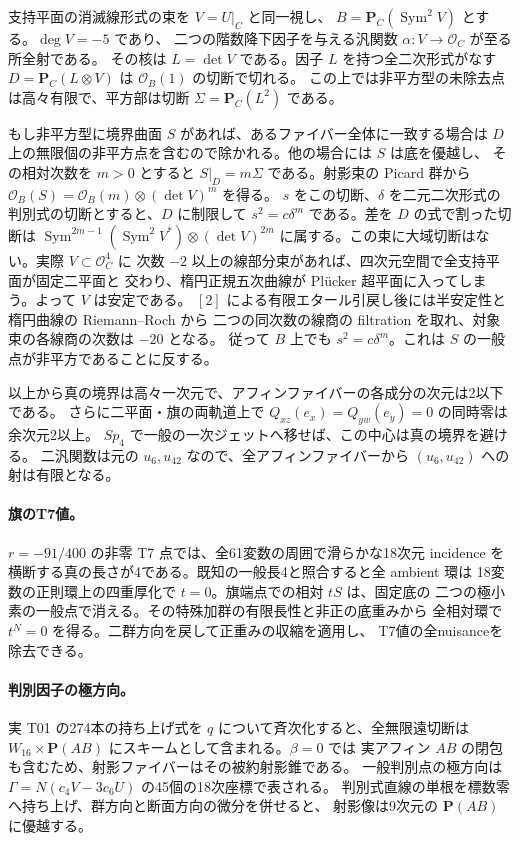 \documentclass[11pt,a4paper]{ltjsarticle}
\theoremstyle{remark}
\begin{document}
支持平面の消滅線形式の束を $V=U|_C$ と同一視し、
$B=\mathbf P_C(\operatorname{Sym}^2V)$ とする。$\deg V=-5$ であり、
二つの階数降下因子を与える汎関数 $\alpha:V\to\mathcal O_C$ が至る所全射である。
その核は $L=\det V$ である。因子 $L$ を持つ全二次形式がなす
$D=\mathbf P_C(L\otimes V)$ は $\mathcal O_B(1)$ の切断で切れる。
この上では非平方型の未除去点は高々有限で、平方部は切断
$\Sigma=\mathbf P_C(L^2)$ である\cite{bound-two-v57,bound-review-v57}。

もし非平方型に境界曲面 $S$ があれば、あるファイバー全体に一致する場合は
$D$ 上の無限個の非平方点を含むので除かれる。他の場合には $S$ は底を優越し、
その相対次数を $m>0$ とすると $S|_D=m\Sigma$ である。射影束の Picard 群から
$\mathcal O_B(S)=\mathcal O_B(m)\otimes(\det V)^m$ を得る。
$s$ をこの切断、$\delta$ を二元二次形式の判別式の切断とすると、$D$ に制限して
$s^2=c\delta^m$ である。差を $D$ の式で割った切断は
$\operatorname{Sym}^{2m-1}(\operatorname{Sym}^2V^*)\otimes(\det V)^{2m}$
に属する。この束に大域切断はない。実際 $V\subset\mathcal O_C^4$ に
次数 $-2$ 以上の線部分束があれば、四次元空間で全支持平面が固定二平面と
交わり、楕円正規五次曲線が Plücker 超平面に入ってしまう。よって $V$ は安定である。
$[2]$ による有限エタール引戻し後には半安定性と楕円曲線の Riemann--Roch から
二つの同次数の線商の filtration を取れ、対象束の各線商の次数は $-20$ となる。
従って $B$ 上でも $s^2=c\delta^m$。これは $S$ の一般点が非平方であることに反する。

以上から真の境界は高々一次元で、アフィンファイバーの各成分の次元は2以下である。
さらに二平面・旗の両軌道上で $Q_{xz}(e_x)=Q_{yw}(e_y)=0$ の同時零は余次元2以上。
$Sp_4$ で一般の一次ジェットへ移せば、この中心は真の境界を避ける。
二汎関数は元の $u_6,u_{42}$ なので、全アフィンファイバーから
$(u_6,u_{42})$ への射は有限となる\cite{two-coord-v57}。

\paragraph{旗のT7値。}
$r=-91/400$ の非零 T7 点では、全61変数の周囲で滑らかな18次元 incidence
を横断する真の長さが4である。既知の一般長4と照合すると全 ambient 環は
18変数の正則環上の四重厚化で $t=0$。旗端点での相対 $tS$ は、固定底の
二つの極小素の一般点で消える。その特殊加群の有限長性と非正の底重みから
全相対環で $t^N=0$ を得る。二群方向を戻して正重みの収縮を適用し、
T7値の全nuisanceを除去できる\cite{t7-point-v57,t7-end-v57}。

\paragraph{判別因子の極方向。}
実 T01 の274本の持ち上げ式を $q$ について斉次化すると、全無限遠切断は
$W_{16}\times\mathbf P(AB)$ にスキームとして含まれる。$\beta=0$ では
実アフィン $AB$ の閉包も含むため、射影ファイバーはその被約射影錐である。
一般判別点の極方向は $\Gamma=N(c_4V-3c_6U)$ の45個の18次座標で表される。
判別式直線の単根を標数零へ持ち上げ、群方向と断面方向の微分を併せると、
射影像は9次元の $\mathbf P(AB)$ に優越する\cite{polar-image-v57}。
\end{document}
